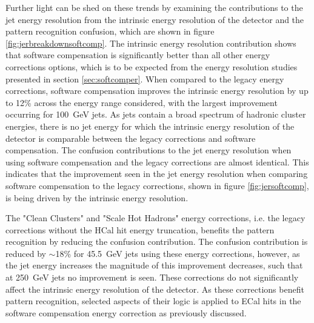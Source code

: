 Further light can be shed on these trends by examining the contributions to the jet energy resolution from the intrinsic energy resolution of the detector and the pattern recognition confusion, which are shown in figure \ref{fig:jerbreakdownsoftcomp}.  The intrinsic energy resolution contribution shows that software compensation is significantly better than all other energy corrections options, which is to be expected from the energy resolution studies presented in section \ref{sec:softcomper}.  When compared to the legacy energy corrections, software compensation improves the intrinsic energy resolution by up to 12\% across the energy range considered, with the largest improvement occurring for 100~GeV jets.  As jets contain a broad spectrum of hadronic cluster energies, there is no jet energy for which the intrinsic energy resolution of the detector is comparable between the legacy corrections and software compensation.  The confusion contributions to the jet energy resolution when using software compensation and the legacy corrections are almost identical.  This indicates that the improvement seen in the jet energy resolution when comparing software compensation to the legacy corrections, shown in figure \ref{fig:jersoftcomp}, is being driven by the intrinsic energy resolution.  

The "Clean Clusters" and "Scale Hot Hadrons" energy corrections, i.e. the legacy corrections without the HCal hit energy truncation, benefits the pattern recognition by reducing the confusion contribution.  The confusion contribution is reduced by $\sim$18\% for 45.5~GeV jets using these energy corrections, however, as the jet energy increases the magnitude of this improvement decreases, such that at 250~GeV jets no improvement is seen.  These corrections do not significantly affect the intrinsic energy resolution of the detector.  As these corrections benefit pattern recognition, selected aspects of their logic is applied to ECal hits in the software compensation energy correction as previously discussed.

